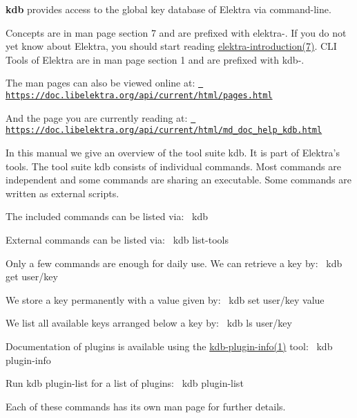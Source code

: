 {\bfseries{kdb}} provides access to the global key database of Elektra via command-\/line.

Concepts are in man page section 7 and are prefixed with {\ttfamily elektra-\/}. If you do not yet know about Elektra, you should start reading \mbox{\hyperlink{doc_help_elektra-introduction_md}{elektra-\/introduction(7)}}. C\+LI Tools of Elektra are in man page section 1 and are prefixed with {\ttfamily kdb-\/}.

The man pages can also be viewed online at\+: \href{https://doc.libelektra.org/api/current/html/pages.html}{\texttt{ https\+://doc.\+libelektra.\+org/api/current/html/pages.\+html}}

And the page you are currently reading at\+: \href{https://doc.libelektra.org/api/current/html/md_doc_help_kdb.html}{\texttt{ https\+://doc.\+libelektra.\+org/api/current/html/md\+\_\+doc\+\_\+help\+\_\+kdb.\+html}}

In this manual we give an overview of the tool suite {\ttfamily kdb}. It is part of Elektra’s tools. The tool suite {\ttfamily kdb} consists of individual commands. Most commands are independent and some commands are sharing an executable. Some commands are written as external scripts.

The included commands can be listed via\+:~\newline
 {\ttfamily kdb}

External commands can be listed via\+:~\newline
 {\ttfamily kdb list-\/tools}

Only a few commands are enough for daily use. We can retrieve a key by\+:~\newline
 {\ttfamily kdb get user/key}

We store a key permanently with a value given by\+:~\newline
 {\ttfamily kdb set user/key value}

We list all available keys arranged below a key by\+:~\newline
 {\ttfamily kdb ls user/key}

Documentation of plugins is available using the \mbox{\hyperlink{doc_help_kdb-plugin-info_md}{kdb-\/plugin-\/info(1)}} tool\+:~\newline
 {\ttfamily kdb plugin-\/info}

Run {\ttfamily kdb plugin-\/list} for a list of plugins\+:~\newline
 {\ttfamily kdb plugin-\/list}

Each of these commands has its own man page for further details.


